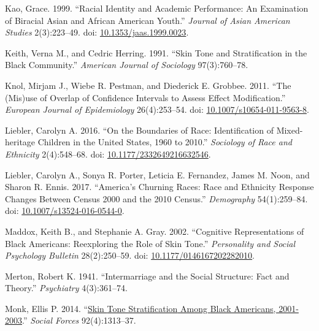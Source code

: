 \documentclass[
  letterpaper,
  DIV=11,
  numbers=noendperiod]{scrartcl}
\newlength{\cslhangindent}
\newlength{\cslentryspacingunit} %
\newenvironment{CSLReferences}[2] %
 {%
  \setlength{\parindent}{0pt}
  \ifodd #1
  \let\oldpar\par
  \def\par{\hangindent=\cslhangindent\oldpar}
  \fi
  \setlength{\parskip}{#2\cslentryspacingunit}
 }%
 {}
\begin{document}
\begin{CSLReferences}{1}{0}
\leavevmode{}%
Kao, Grace. 1999. {``Racial {Identity} and {Academic Performance}: {An
Examination} of {Biracial Asian} and {African American Youth}.''}
\emph{Journal of Asian American Studies} 2(3):223--49. doi:
\href{https://doi.org/10.1353/jaas.1999.0023}{10.1353/jaas.1999.0023}.

\leavevmode{}%
Keith, Verna M., and Cedric Herring. 1991. {``Skin {Tone} and
{Stratification} in the {Black Community}.''} \emph{American Journal of
Sociology} 97(3):760--78.

\leavevmode{}%
Knol, Mirjam J., Wiebe R. Pestman, and Diederick E. Grobbee. 2011.
{``The (Mis)use of Overlap of Confidence Intervals to Assess Effect
Modification.''} \emph{European Journal of Epidemiology} 26(4):253--54.
doi:
\href{https://doi.org/10.1007/s10654-011-9563-8}{10.1007/s10654-011-9563-8}.

\leavevmode{}%
Liebler, Carolyn A. 2016. {``On the {Boundaries} of {Race}:
{Identification} of {Mixed-heritage Children} in the {United States},
1960 to 2010.''} \emph{Sociology of Race and Ethnicity} 2(4):548--68.
doi:
\href{https://doi.org/10.1177/2332649216632546}{10.1177/2332649216632546}.

\leavevmode{}%
Liebler, Carolyn A., Sonya R. Porter, Leticia E. Fernandez, James M.
Noon, and Sharon R. Ennis. 2017. {``America's {Churning Races}: {Race}
and {Ethnicity Response Changes Between Census} 2000 and the 2010
{Census}.''} \emph{Demography} 54(1):259--84. doi:
\href{https://doi.org/10.1007/s13524-016-0544-0}{10.1007/s13524-016-0544-0}.

\leavevmode{}%
Maddox, Keith B., and Stephanie A. Gray. 2002. {``Cognitive
{Representations} of {Black Americans}: {Reexploring} the {Role} of
{Skin Tone}.''} \emph{Personality and Social Psychology Bulletin}
28(2):250--59. doi:
\href{https://doi.org/10.1177/0146167202282010}{10.1177/0146167202282010}.

\leavevmode{}%
Merton, Robert K. 1941. {``Intermarriage and the {Social Structure}:
{Fact} and {Theory}.''} \emph{Psychiatry} 4(3):361--74.

\leavevmode{}%
Monk, Ellis P. 2014.
{``\href{https://www.jstor.org/stable/43287571}{Skin {Tone
Stratification} Among {Black Americans}, 2001-2003}.''} \emph{Social
Forces} 92(4):1313--37.


\end{CSLReferences}
\end{document}
